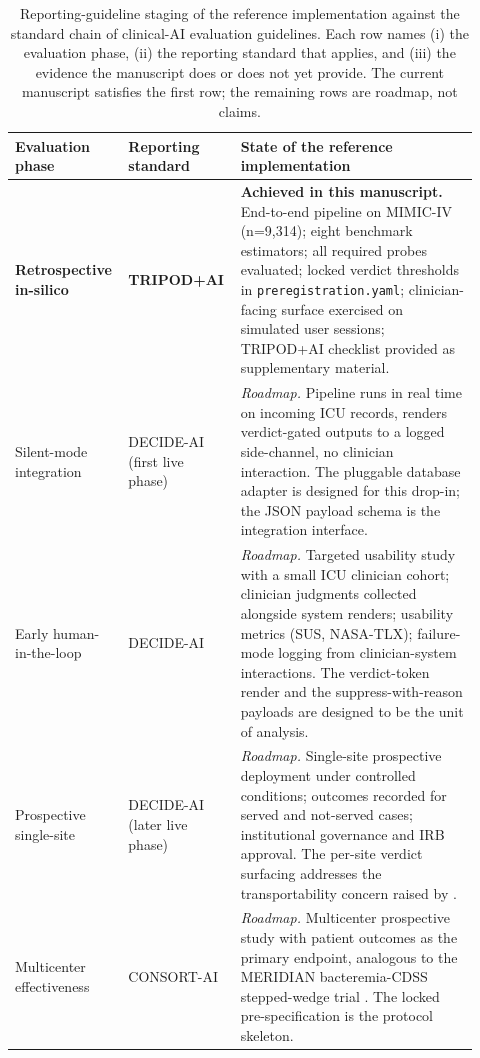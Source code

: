 \documentclass[11pt,a4paper]{article}
\begin{document}
\begin{table}[H]
\centering\small
\caption{Reporting-guideline staging of the reference implementation against the standard chain of clinical-AI evaluation guidelines. Each row names (i) the evaluation phase, (ii) the reporting standard that applies, and (iii) the evidence the manuscript does or does not yet provide. The current manuscript satisfies the first row; the remaining rows are roadmap, not claims.}
\label{tab:decide_ai}
\begin{tabular}{p{0.20\linewidth}p{0.22\linewidth}p{0.50\linewidth}}
\toprule
Evaluation phase & Reporting standard & State of the reference implementation \\
\midrule
\textbf{Retrospective in-silico} & \textbf{TRIPOD+AI} \cite{tripodai2024} & \textbf{Achieved in this manuscript.} End-to-end pipeline on MIMIC-IV (n=9{,}314); eight benchmark estimators; all required probes evaluated; locked verdict thresholds in \texttt{preregistration.yaml}; clinician-facing surface exercised on simulated user sessions; TRIPOD+AI checklist provided as supplementary material. \\
\midrule
Silent-mode integration & DECIDE-AI \cite{decideai2022} (first live phase) & \emph{Roadmap.} Pipeline runs in real time on incoming ICU records, renders verdict-gated outputs to a logged side-channel, no clinician interaction. The pluggable database adapter is designed for this drop-in; the JSON payload schema is the integration interface. \\
Early human-in-the-loop & DECIDE-AI \cite{decideai2022} & \emph{Roadmap.} Targeted usability study with a small ICU clinician cohort; clinician judgments collected alongside system renders; usability metrics (SUS, NASA-TLX); failure-mode logging from clinician-system interactions. The verdict-token render and the suppress-with-reason payloads are designed to be the unit of analysis. \\
Prospective single-site & DECIDE-AI \cite{decideai2022} (later live phase) & \emph{Roadmap.} Single-site prospective deployment under controlled conditions; outcomes recorded for served and not-served cases; institutional governance and IRB approval. The per-site verdict surfacing addresses the transportability concern raised by \cite{wornow2025transportability}. \\
Multicenter effectiveness & CONSORT-AI \cite{consortai2020} & \emph{Roadmap.} Multicenter prospective study with patient outcomes as the primary endpoint, analogous to the MERIDIAN bacteremia-CDSS stepped-wedge trial \cite{meridian2025}. The locked pre-specification is the protocol skeleton. \\
\bottomrule
\end{tabular}
\end{table}
\end{document}
